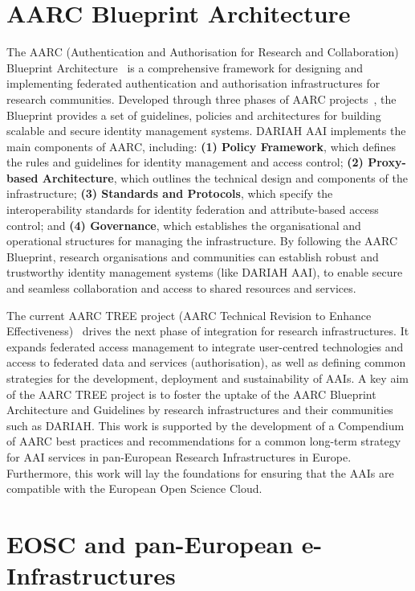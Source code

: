 \documentclass[final]{anthology-ch} %
\begin{document}
\section{AARC Blueprint Architecture}

The AARC (Authentication and Authorisation for Research and Collaboration) Blueprint Architecture~\cite{aarc_community_members_2019_3672785} is a comprehensive framework for designing and implementing federated authentication and authorisation infrastructures for research communities. Developed through three phases of AARC projects~\cite{web_AARC}, the Blueprint provides a set of guidelines, policies and architectures for building scalable and secure identity management systems. DARIAH AAI implements the main components of AARC, including: \textbf{(1) Policy Framework}, which defines the rules and guidelines for identity management and access control; \textbf{(2) Proxy-based Architecture}, which outlines the technical design and components of the infrastructure; \textbf{(3) Standards and Protocols}, which specify the interoperability standards for identity federation and attribute-based access control; and \textbf{(4) Governance}, which establishes the organisational and operational structures for managing the infrastructure. 
By following the AARC Blueprint, research organisations and communities can establish robust and trustworthy identity management systems (like DARIAH AAI), to enable secure and seamless collaboration and access to shared resources and services. 

The current AARC TREE project (AARC Technical Revision to Enhance Effectiveness)~\cite{web_aarc_tree} drives the next phase of integration for research infrastructures. It expands federated access management to integrate user-centred technologies and access to federated data and services (authorisation), as well as defining common strategies for the development, deployment and sustainability of AAIs.
A key aim of the AARC TREE project is to foster the uptake of the AARC Blueprint Architecture and Guidelines by research infrastructures and their communities such as DARIAH. This work is supported by the development of a Compendium of AARC best practices and recommendations for a common long-term strategy for AAI services in pan-European Research Infrastructures in Europe. Furthermore, this work will lay the foundations for ensuring that the AAIs are compatible with the European Open Science Cloud. 



\section{EOSC and pan-European e-Infrastructures}
 
\end{document}
